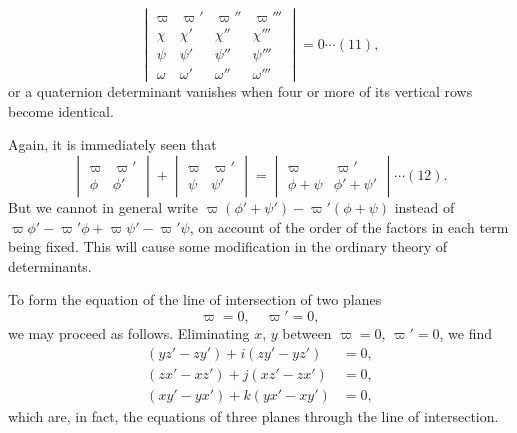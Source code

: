 \documentclass[11pt,a4paper]{book}
\begin{document}
\begin{equation}
\begin{vmatrix}
\varpi & \varpi' & \varpi'' & \varpi''' \\
\chi & \chi' & \chi'' & \chi''' \\
\psi & \psi' & \psi'' & \psi''' \\
\omega & \omega' & \omega'' & \omega'''
\end{vmatrix}
= 0 \cdots (11),
\end{equation}
or a quaternion determinant vanishes when four or more of its vertical rows become
identical.

\newpage
\setcounter{page}{125}

Again, it is immediately seen that
\begin{equation}
\begin{vmatrix}
\varpi & \varpi' \\
\phi & \phi'
\end{vmatrix}
+ \begin{vmatrix}
\varpi & \varpi' \\
\psi & \psi'
\end{vmatrix}
= \begin{vmatrix}
\varpi & \varpi' \\
\phi + \psi & \phi' + \psi'
\end{vmatrix} \cdots (12).
\end{equation}
But we cannot in general write $\varpi(\phi' + \psi') - \varpi'(\phi + \psi)$ instead of
$\varpi\phi' - \varpi'\phi + \varpi\psi' - \varpi'\psi$, on account of the order of the factors in each term
being fixed. This will cause some modification in the ordinary theory of determinants.

To form the equation of the line of intersection of two planes
\[
\varpi = 0,\quad \varpi' = 0,
\]
we may proceed as follows. Eliminating $x$, $y$ between $\varpi = 0$, $\varpi' = 0$, we find
\begin{align*}
(yz' - zy') + i(zy' - yz') &= 0,\\
(zx' - xz') + j(xz' - zx') &= 0,\\
(xy' - yx') + k(yx' - xy') &= 0,
\end{align*}
which are, in fact, the equations of three planes through the line of intersection.

\newpage
\setcounter{page}{126}
\end{document}
